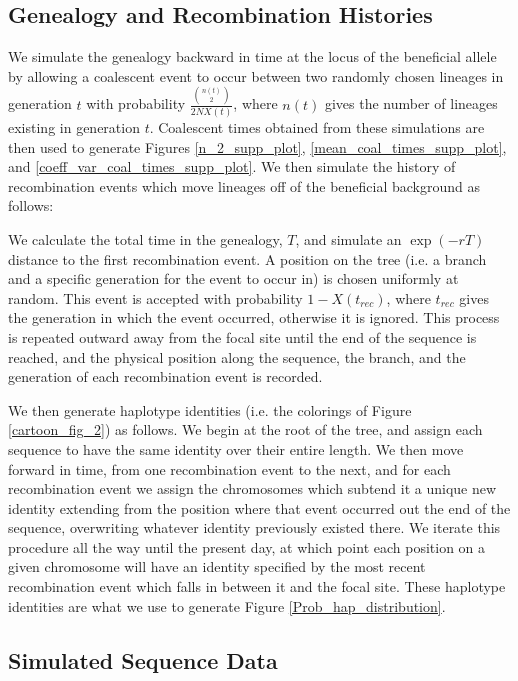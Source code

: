 \documentclass[a4paper,10pt]{article}
\begin{document}
\subsection*{Genealogy and Recombination Histories}

We simulate the genealogy backward in time at the locus of the beneficial allele by allowing a coalescent event to occur between two randomly chosen lineages in generation $t$ with probability $\frac{{n\left(t\right) \choose 2}}{2NX\left(t\right)}$, where $n\left(t\right)$ gives the number of lineages existing in generation $t$. Coalescent times obtained from these simulations are then used to generate Figures \ref{n_2_supp_plot}, \ref{mean_coal_times_supp_plot}, and \ref{coeff_var_coal_times_supp_plot}. We then simulate the history of recombination events which move lineages off of the beneficial background as follows:

We calculate the total time in the genealogy, $T$, and simulate an $\exp\left(-rT\right)$ distance to the first recombination event. A position on the tree (i.e. a branch and a specific generation for the event to occur in) is chosen uniformly at random. This event is accepted with probability $1-X\left(t_{rec}\right)$, where $t_{rec}$ gives the generation in which the event occurred, otherwise it is ignored. This process is repeated outward away from the focal site until the end of the sequence is reached, and the physical position along the sequence, the branch, and the generation of each recombination event is recorded.

We then generate haplotype identities (i.e. the colorings of Figure \ref{cartoon_fig_2}) as follows. We begin at the root of the tree, and assign each sequence to have the same identity over their entire length. We then move forward in time, from one recombination event to the next, and for each recombination event we assign the chromosomes which subtend it a unique new identity extending from the position where that event occurred out the end of the sequence, overwriting whatever identity previously existed there. We iterate this procedure all the way until the present day, at which point each position on a given chromosome will have an identity specified by the most recent recombination event which falls in between it and the focal site. These haplotype identities are what we use to generate Figure \ref{Prob_hap_distribution}.

\subsection*{Simulated Sequence Data}
\end{document}
